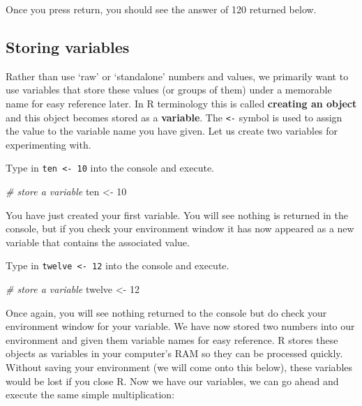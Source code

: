 \documentclass[
]{book}
\newenvironment{Shaded}{\begin{snugshade}}{\end{snugshade}}
\newcommand{\CommentTok}[1]{\textcolor[rgb]{0.56,0.35,0.01}{\textit{#1}}}
\newcommand{\DecValTok}[1]{\textcolor[rgb]{0.00,0.00,0.81}{#1}}
\newcommand{\NormalTok}[1]{#1}
\newcommand{\OtherTok}[1]{\textcolor[rgb]{0.56,0.35,0.01}{#1}}
\begin{document}
Once you press return, you should see the answer of 120 returned below.

\hypertarget{storing-variables}{%
\subsection{Storing variables}\label{storing-variables}}

Rather than use `raw' or `standalone' numbers and values, we primarily want to use variables that store these values (or groups of them) under a memorable name for easy reference later. In R terminology this is called \textbf{creating an object} and this object becomes stored as a \textbf{variable}. The \texttt{\textless{}-} symbol is used to assign the value to the variable name you have given. Let us create two variables for experimenting with.

Type in \texttt{ten\ \textless{}-\ 10} into the console and execute.

\begin{Shaded}
\begin{Highlighting}[]
\CommentTok{\# store a variable}
\NormalTok{ten }\OtherTok{\textless{}{-}} \DecValTok{10}
\end{Highlighting}
\end{Shaded}

You have just created your first variable. You will see nothing is returned in the console, but if you check your environment window it has now appeared as a new variable that contains the associated value.

Type in \texttt{twelve\ \textless{}-\ 12} into the console and execute.

\begin{Shaded}
\begin{Highlighting}[]
\CommentTok{\# store a variable}
\NormalTok{twelve }\OtherTok{\textless{}{-}} \DecValTok{12}
\end{Highlighting}
\end{Shaded}

Once again, you will see nothing returned to the console but do check your environment window for your variable. We have now stored two numbers into our environment and given them variable names for easy reference. R stores these objects as variables in your computer's RAM so they can be processed quickly. Without saving your environment (we will come onto this below), these variables would be lost if you close R. Now we have our variables, we can go ahead and execute the same simple multiplication:
\end{document}
